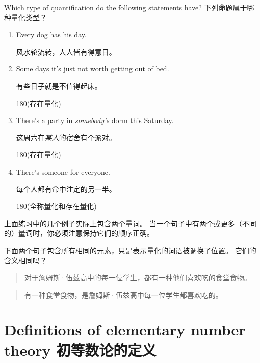 \vspace{.2in}

\begin{exer} Which type of quantification do the following
  statements have?
  下列命题属于哪种量化类型？
  \begin{enumerate}
    \item Every dog has his day.

          风水轮流转，人人皆有得意日。 
    \item Some days it's just not worth getting out of bed.

          有些日子就是不值得起床。\begin{turn}{180}(存在量化)\end{turn}
    \item There's a party in {\em somebody's} dorm this Saturday.

          这周六在{\em 某人}的宿舍有个派对。\begin{turn}{180}(存在量化)\end{turn}
    \item There's someone for everyone.

          每个人都有命中注定的另一半。\begin{turn}{180}(全称量化和存在量化)\end{turn}
  \end{enumerate}
\end{exer}


上面练习中的几个例子实际上包含两个量词。
当一个句子中有两个或更多（不同的）量词时，你必须注意保持它们的顺序正确。

下面两个句子包含所有相同的元素，只是表示量化的词语被调换了位置。
它们的含义相同吗？


\begin{quote}
  对于詹姆斯·伍兹高中的每一位学生，都有一种他们喜欢吃的食堂食物。
\end{quote}

\begin{quote}
  有一种食堂食物，是詹姆斯·伍兹高中每一位学生都喜欢吃的。
\end{quote}

\newpage





\newpage

\section{Definitions of elementary number theory 初等数论的定义}
\label{sec:num_thry}

